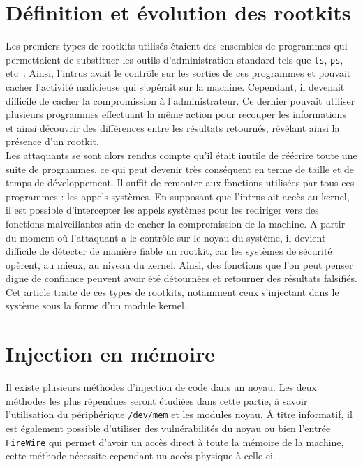\documentclass[12pt]{article}
\begin{document}
\section{Définition et évolution des rootkits}
    
    Les premiers types de rootkits utilisés étaient des ensembles de programmes qui permettaient de substituer les outils d'administration standard tels que \texttt{ls}, \texttt{ps}, etc~\cite{sans}. Ainsi, l'intrus avait le contrôle sur les sorties de ces programmes et pouvait cacher l'activité malicieuse qui s'opérait sur la machine. Cependant, il devenait difficile de cacher la compromission à l'administrateur. Ce dernier pouvait utiliser plusieurs programmes effectuant la même action pour recouper les informations et ainsi découvrir des différences entre les résultats retournés, révélant ainsi la présence d'un rootkit.\\
    
    Les attaquants se sont alors rendus compte qu'il était inutile de réécrire toute une suite de programmes, ce qui peut devenir très conséquent en terme de taille et de temps de développement. Il suffit de remonter aux fonctions utilisées par tous ces programmes : les appels systèmes\cite{sans2}\cite{turbochaos}. En supposant que l'intrus ait accès au kernel, il est possible d'intercepter les appels systèmes pour les rediriger vers des fonctions malveillantes afin de cacher la compromission de la machine. A partir du moment où l'attaquant a le contrôle sur le noyau du système, il devient difficile de détecter de manière fiable un rootkit, car les systèmes de sécurité opèrent, au mieux, au niveau du kernel. Ainsi, des fonctions que l'on peut penser digne de confiance peuvent avoir été détournées et retourner des résultats falsifiés. \\
    Cet article traite de ces types de rootkits, notamment ceux s'injectant dans le système sous la forme d'un module kernel\cite{suterusu}.



\section{Injection en mémoire}

    Il existe plusieurs méthodes d'injection de code dans un noyau. Les deux méthodes les plus répendues seront étudiées dans cette partie, à savoir l'utilisation du périphérique \texttt{/dev/mem}\cite{devmen} et les modules noyau\cite{turbochaos}. À titre informatif, il est également possible d'utiliser des vulnérabilités du noyau ou bien l'entrée \texttt{FireWire}\cite{firewire} qui permet d'avoir un accès direct à toute la mémoire de la machine, cette méthode nécessite cependant un accès physique à celle-ci.
\end{document}
